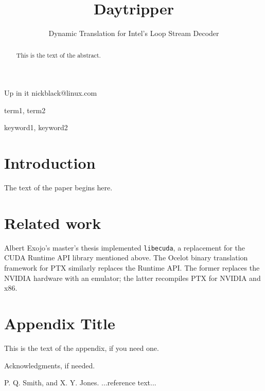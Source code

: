 \documentclass[preprint]{sigplanconf}
\begin{document}
\copyrightdata{[to be supplied]} 


\title{Daytripper}
\subtitle{Dynamic Translation for Intel's Loop Stream Decoder}

           {Up in it}
           {nickblack@linux.com}

\maketitle

\begin{abstract}
This is the text of the abstract.
\end{abstract}


\terms
term1, term2

\keywords
keyword1, keyword2

\section{Introduction}

The text of the paper begins here.

\section{Related work}
Albert Exojo's master's thesis implemented \texttt{libecuda}\cite{exojo}, a
replacement for the CUDA Runtime API library mentioned above. The
Ocelot\cite{ocelot} binary translation framework for PTX similarly replaces the
Runtime API. The former replaces the NVIDIA hardware with an emulator; the
latter recompiles PTX for NVIDIA and x86.

\appendix
\section{Appendix Title}

This is the text of the appendix, if you need one.

\acks

Acknowledgments, if needed.






\begin{thebibliography}{}
\softraggedright

P. Q. Smith, and X. Y. Jones. ...reference text...

\end{thebibliography}
\end{document}
